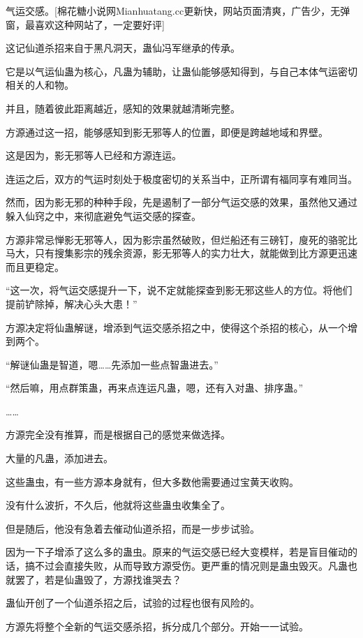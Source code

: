 
\begin{this_body}

气运交感。[棉花糖小说网Mianhuatang.cc更新快，网站页面清爽，广告少，无弹窗，最喜欢这种网站了，一定要好评]

这记仙道杀招来自于黑凡洞天，蛊仙冯军继承的传承。

它是以气运仙蛊为核心，凡蛊为辅助，让蛊仙能够感知得到，与自己本体气运密切相关的人和物。

并且，随着彼此距离越近，感知的效果就越清晰完整。

方源通过这一招，能够感知到影无邪等人的位置，即便是跨越地域和界壁。

这是因为，影无邪等人已经和方源连运。

连运之后，双方的气运时刻处于极度密切的关系当中，正所谓有福同享有难同当。

然而，因为影无邪的种种手段，先是遏制了一部分气运交感的效果，虽然他又通过躲入仙窍之中，来彻底避免气运交感的探查。

方源非常忌惮影无邪等人，因为影宗虽然破败，但烂船还有三磅钉，廋死的骆驼比马大，只有搜集影宗的残余资源，影无邪等人的实力壮大，就能做到比方源更迅速而且更稳定。

“这一次，将气运交感提升一下，说不定就能探查到影无邪这些人的方位。将他们提前铲除掉，解决心头大患！”

方源决定将仙蛊解谜，增添到气运交感杀招之中，使得这个杀招的核心，从一个增到两个。

“解谜仙蛊是智道，嗯……先添加一些点智蛊进去。”

“然后嘛，用点群策蛊，再来点连运凡蛊，嗯，还有入对蛊、排序蛊。”

……

方源完全没有推算，而是根据自己的感觉来做选择。

大量的凡蛊，添加进去。

这些蛊虫，有一些方源本身就有，但大多数他需要通过宝黄天收购。

没有什么波折，不久后，他就将这些蛊虫收集全了。

但是随后，他没有急着去催动仙道杀招，而是一步步试验。

因为一下子增添了这么多的蛊虫。原来的气运交感已经大变模样，若是盲目催动的话，搞不过会直接失败，从而导致方源受伤。更严重的情况则是蛊虫毁灭。凡蛊也就罢了，若是仙蛊毁了，方源找谁哭去？

蛊仙开创了一个仙道杀招之后，试验的过程也很有风险的。

方源先将整个全新的气运交感杀招，拆分成几个部分。开始一一试验。


\end{this_body}
